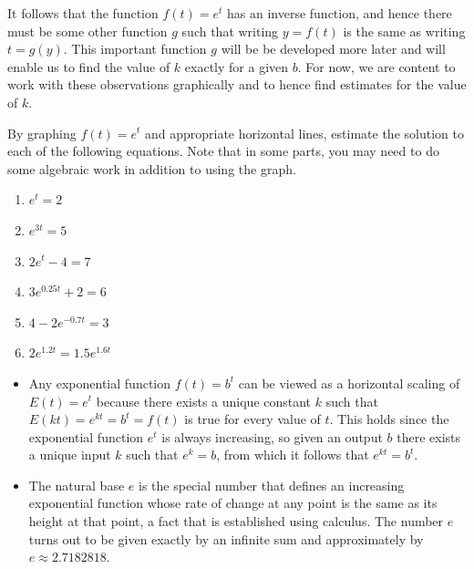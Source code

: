 \documentclass[nooutcomes]{ximera}
\begin{document}
It follows that the function $f(t) = e^t$ has an inverse function, and hence there must be some other function $g$ such that writing $y = f(t)$ is the same as writing $t = g(y)$.  This important function $g$ will be be developed more later and will enable us to find the value of $k$ exactly for a given $b$.  For now, we are content to work with these observations graphically and to hence find estimates for the value of $k$.

\begin{exploration}
By graphing $f(t) = e^t$ and appropriate horizontal lines, estimate the solution to each of the following equations.  Note that in some parts, you may need to do some algebraic work in addition to using the graph.
\begin{enumerate}[label=\alph*.]
\item $e^t = 2$
\item $e^{3t} = 5$
\item $2e^t - 4 = 7$
\item $3e^{0.25t} + 2 = 6$
\item $4 - 2e^{-0.7t} = 3$
\item $2e^{1.2t} = 1.5e^{1.6t}$
\end{enumerate}
\end{exploration}


\begin{summary}\begin{itemize}
\item Any exponential function $f(t) = b^t$ can be viewed as a horizontal scaling of $E(t) = e^t$ because there exists a unique constant $k$ such that $E(kt) = e^{kt} = b^t = f(t)$ is true for every value of $t$.  This holds since the exponential function $e^t$ is always increasing, so given an output $b$ there exists a unique input $k$ such that $e^k = b$, from which it follows that $e^{kt} = b^t$.
\item The natural base $e$ is the special number that defines an increasing exponential function whose rate of change at any point is the same as its height at that point, a fact that is established using calculus.  The number $e$ turns out to be given exactly by an infinite sum and approximately by $e \approx 2.7182818$.
\end{itemize}\end{summary}
\end{document}
